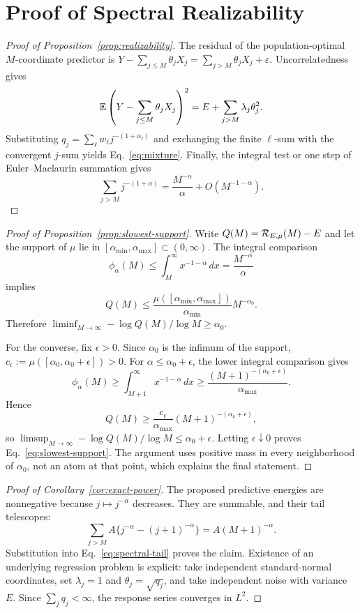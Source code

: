\section{Proof of Spectral Realizability}

\begin{proof}[Proof of Proposition~\ref{prop:realizability}]
The residual of the population-optimal $M$-coordinate predictor is
$Y-\sum_{j\le M}\theta_jX_j=\sum_{j>M}\theta_jX_j+\varepsilon$.
Uncorrelatedness gives
\[
\mathbb{E}\left(Y-\sum_{j\le M}\theta_jX_j\right)^2
=E+\sum_{j>M}\lambda_j\theta_j^2.
\]
Substituting $q_j=\sum_\ell w_\ell j^{-(1+\alpha_\ell)}$ and exchanging the finite $\ell$-sum with the convergent $j$-sum yields Eq.~\eqref{eq:mixture}. Finally, the integral test or one step of Euler--Maclaurin summation gives
\[
\sum_{j>M}j^{-(1+\alpha)}
=\frac{M^{-\alpha}}{\alpha}+O(M^{-1-\alpha}).
\]
\end{proof}

\begin{proof}[Proof of Proposition~\ref{prop:slowest-support}]
Write $Q(M)=\mathcal{R}_{E,\mu}(M)-E$ and let the support of $\mu$ lie in
$[\alpha_{\min},\alpha_{\max}]\subset(0,\infty)$. The integral comparison
\[
 \phi_\alpha(M)\le \int_M^\infty x^{-1-\alpha}\,dx
 =\frac{M^{-\alpha}}{\alpha}
\]
implies
\[
 Q(M)\le \frac{\mu([\alpha_{\min},\alpha_{\max}])}{\alpha_{\min}}
 M^{-\alpha_0}.
\]
Therefore
$\liminf_{M\to\infty}-\log Q(M)/\log M\ge\alpha_0$.

For the converse, fix $\epsilon>0$. Since $\alpha_0$ is the infimum of the support,
$c_\epsilon:=\mu([\alpha_0,\alpha_0+\epsilon])>0$. For
$\alpha\le\alpha_0+\epsilon$, the lower integral comparison gives
\[
 \phi_\alpha(M)\ge \int_{M+1}^\infty x^{-1-\alpha}\,dx
 \ge \frac{(M+1)^{-(\alpha_0+\epsilon)}}{\alpha_{\max}}.
\]
Hence
\[
 Q(M)\ge \frac{c_\epsilon}{\alpha_{\max}}
 (M+1)^{-(\alpha_0+\epsilon)},
\]
so
$\limsup_{M\to\infty}-\log Q(M)/\log M\le\alpha_0+\epsilon$.
Letting $\epsilon\downarrow0$ proves Eq.~\eqref{eq:slowest-support}. The argument uses positive mass in every neighborhood of $\alpha_0$, not an atom at that point, which explains the final statement.
\end{proof}

\begin{proof}[Proof of Corollary~\ref{cor:exact-power}]
The proposed predictive energies are nonnegative because $j\mapsto j^{-\alpha}$ decreases. They are summable, and their tail telescopes:
\[
 \sum_{j>M}A\{j^{-\alpha}-(j+1)^{-\alpha}\}
 =A(M+1)^{-\alpha}.
\]
Substitution into Eq.~\eqref{eq:spectral-tail} proves the claim. Existence of an underlying regression problem is explicit: take independent standard-normal coordinates, set $\lambda_j=1$ and $\theta_j=\sqrt{q_j}$, and take independent noise with variance $E$. Since $\sum_jq_j<\infty$, the response series converges in $L^2$.
\end{proof}

